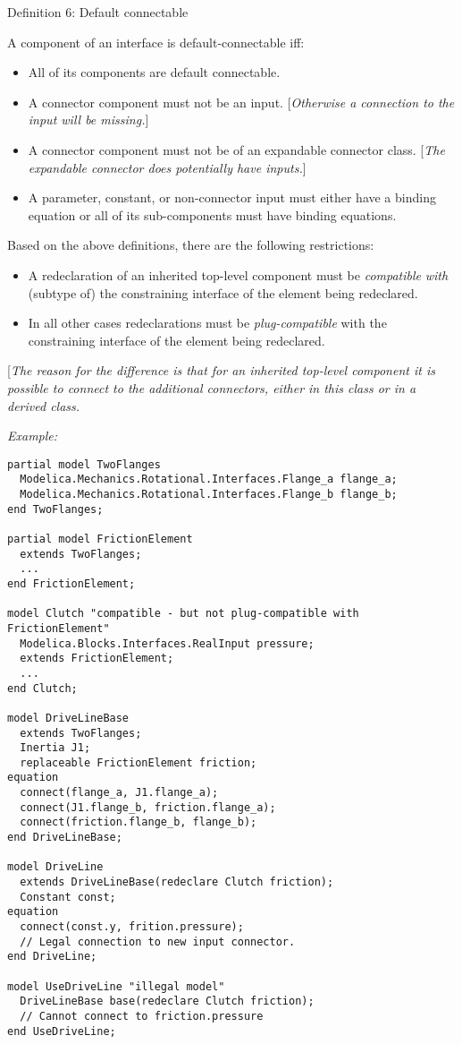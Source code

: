 Definition 6: Default connectable

A component of an interface is default-connectable iff:

\begin{itemize}
\item
  All of its components are default connectable.
\item
  A connector component must not be an input. {[}\emph{Otherwise a
  connection to the input will be missing.}{]}
\item
  A connector component must not be of an expandable connector class.
  {[}\emph{The expandable connector does potentially have inputs.}{]}
\item
  A parameter, constant, or non-connector input must either have a
  binding equation or all of its sub-components must have binding
  equations.
\end{itemize}

Based on the above definitions, there are the following restrictions:

\begin{itemize}
\item
  A redeclaration of an inherited top-level component must be
  \emph{compatible} \emph{with} (subtype of) the constraining interface
  of the element being redeclared.
\item
  In all other cases redeclarations must be \emph{plug-compatible} with
  the constraining interface of the element being redeclared.
\end{itemize}

{[}\emph{The reason for the difference is that for an inherited
top-level component it is possible to connect to the additional
connectors, either in this class or in a derived class.}

\emph{Example:}
\begin{lstlisting}[language=modelica]
partial model TwoFlanges
  Modelica.Mechanics.Rotational.Interfaces.Flange_a flange_a;
  Modelica.Mechanics.Rotational.Interfaces.Flange_b flange_b;
end TwoFlanges;

partial model FrictionElement
  extends TwoFlanges;
  ...
end FrictionElement;

model Clutch "compatible - but not plug-compatible with FrictionElement"
  Modelica.Blocks.Interfaces.RealInput pressure;
  extends FrictionElement;
  ...
end Clutch;

model DriveLineBase
  extends TwoFlanges;
  Inertia J1;
  replaceable FrictionElement friction;
equation
  connect(flange_a, J1.flange_a);
  connect(J1.flange_b, friction.flange_a);
  connect(friction.flange_b, flange_b);
end DriveLineBase;

model DriveLine
  extends DriveLineBase(redeclare Clutch friction);
  Constant const;
equation
  connect(const.y, frition.pressure);
  // Legal connection to new input connector.
end DriveLine;

model UseDriveLine "illegal model"
  DriveLineBase base(redeclare Clutch friction);
  // Cannot connect to friction.pressure
end UseDriveLine;
\end{lstlisting}

